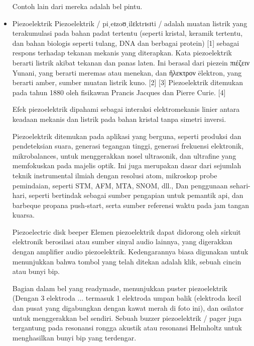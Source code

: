 \begin{itemize}
Contoh lain dari mereka adalah bel pintu.
\item Piezoelektrik
Piezoelektrik / piˌeɪzoʊˌilɛktrɪsɪti / adalah muatan listrik yang terakumulasi pada bahan padat tertentu (seperti kristal, keramik tertentu, dan bahan biologis 
seperti tulang, DNA dan berbagai protein) [1] sebagai respons terhadap tekanan mekanis yang diterapkan. Kata piezoelektrik berarti listrik akibat tekanan dan 
panas laten. Ini berasal dari piezein πιέζειν Yunani, yang berarti meremas atau menekan, dan ἤλεκτρον ēlektron, yang berarti amber, sumber muatan listrik kuno.
[2] [3] Piezoelektrik ditemukan pada tahun 1880 oleh fisikawan Prancis Jacques dan Pierre Curie. [4]

Efek piezoelektrik dipahami sebagai interaksi elektromekanis linier antara keadaan mekanis dan listrik pada bahan kristal tanpa simetri inversi.

Piezoelektrik ditemukan pada aplikasi yang berguna, seperti produksi dan pendeteksian suara, generasi tegangan tinggi, generasi frekuensi elektronik, mikrobalances, 
untuk menggerakkan nosel ultrasonik, dan ultrafine yang memfokuskan pada majelis optik. Ini juga merupakan dasar dari sejumlah teknik instrumental ilmiah dengan 
resolusi atom, mikroskop probe pemindaian, seperti STM, AFM, MTA, SNOM, dll., Dan penggunaan sehari-hari, seperti bertindak sebagai sumber pengapian untuk pemantik 
api, dan barbeque propana push-start, serta sumber referensi waktu pada jam tangan kuarsa.

Piezoelectric disk beeper
Elemen piezoelektrik dapat didorong oleh sirkuit elektronik berosilasi atau sumber sinyal audio lainnya, yang digerakkan dengan amplifier audio piezoelektrik. Kedengarannya biasa digunakan untuk menunjukkan bahwa tombol yang telah ditekan adalah klik, sebuah cincin atau bunyi bip.

Bagian dalam bel yang readymade, menunjukkan puster piezoelektrik (Dengan 3 elektroda ... termasuk 1 elektroda umpan balik (elektroda kecil dan pusat yang digabungkan dengan kawat merah di foto ini), dan osilator untuk menggerakkan bel sendiri.
Sebuah buzzer piezoelektrik / pager juga tergantung pada resonansi rongga akustik atau resonansi Helmholtz untuk menghasilkan bunyi bip yang terdengar.
\end{itemize}

\cite{series1994atlas}
\cite{richards1948resistor}
\cite{bellone2005multiple}
\cite{gan2010performance}